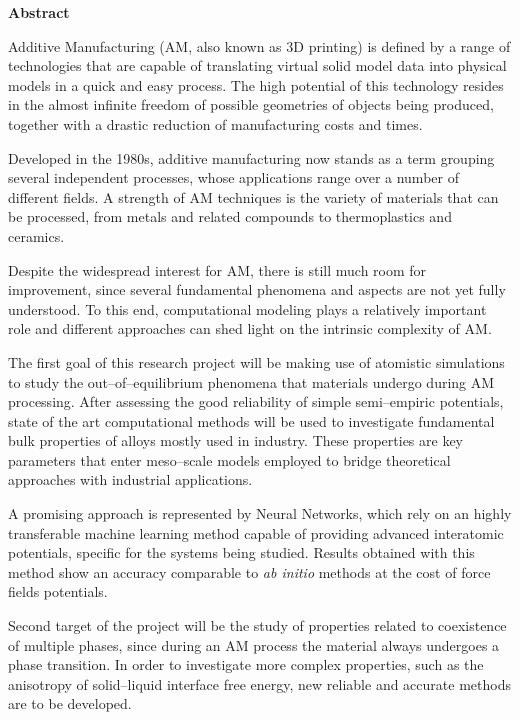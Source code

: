 \thispagestyle{empty}
\begin{center}
	{\Large\bfseries Abstract}
\end{center}

Additive Manufacturing (AM, also known as 3D printing) is defined by a range of technologies that are capable of translating virtual solid model data into physical models in a quick and easy process.
The high potential of this technology resides in the almost infinite freedom of possible geometries of objects being produced, together with a drastic reduction of manufacturing costs and times.

Developed in the 1980s, additive manufacturing now stands as a term grouping several independent processes, whose applications range over a number of different fields.  
A strength of AM techniques is the variety of materials that can be processed, from metals and related compounds to thermoplastics and ceramics.

Despite the widespread interest for AM, there is still much room for improvement, since several fundamental phenomena and aspects are not yet fully understood.
To this end, computational modeling plays a relatively important role and different approaches can shed light on the intrinsic complexity of AM.

The first goal of this research project will be making use of atomistic simulations to study the out--of--equilibrium phenomena that materials undergo during AM processing. After assessing the good reliability of simple semi--empiric potentials, state of the art computational methods will be used to investigate fundamental bulk properties of alloys mostly used in industry. These properties are key parameters that enter meso--scale models employed to bridge theoretical approaches with industrial applications.

A promising approach is represented by Neural Networks, which rely on an highly transferable machine learning method capable of providing advanced interatomic potentials, specific for the systems being studied. Results obtained with this method show an accuracy comparable to \textit{ab initio} methods at the cost of force fields potentials.

Second target of the project will be the study of properties related to coexistence of multiple phases, since during an AM process the material always undergoes a phase transition. In order to investigate more complex properties, such as the anisotropy of solid--liquid interface free energy, new reliable and accurate methods are to be developed.




